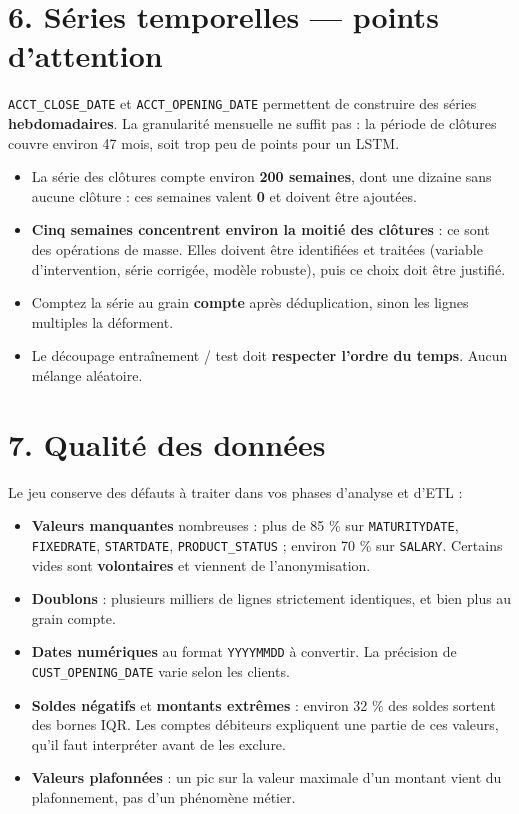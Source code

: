 \documentclass[11pt,a4paper]{article}
\providecommand{\tightlist}{\setlength{\itemsep}{0pt}\setlength{\parskip}{0pt}}
\begin{document}
\section{6. Séries temporelles --- points
d'attention}\label{suxe9ries-temporelles-points-dattention}

\texttt{ACCT\_CLOSE\_DATE} et \texttt{ACCT\_OPENING\_DATE} permettent de
construire des séries \textbf{hebdomadaires}. La granularité mensuelle
ne suffit pas : la période de clôtures couvre environ 47 mois, soit trop
peu de points pour un LSTM.

\begin{itemize}
\tightlist
\item
  La série des clôtures compte environ \textbf{200 semaines}, dont une
  dizaine sans aucune clôture : ces semaines valent \textbf{0} et
  doivent être ajoutées.
\item
  \textbf{Cinq semaines concentrent environ la moitié des clôtures} : ce
  sont des opérations de masse. Elles doivent être identifiées et
  traitées (variable d'intervention, série corrigée, modèle robuste),
  puis ce choix doit être justifié.
\item
  Comptez la série au grain \textbf{compte} après déduplication, sinon
  les lignes multiples la déforment.
\item
  Le découpage entraînement / test doit \textbf{respecter l'ordre du
  temps}. Aucun mélange aléatoire.
\end{itemize}

\section{7. Qualité des données}\label{qualituxe9-des-donnuxe9es}

Le jeu conserve des défauts à traiter dans vos phases d'analyse et d'ETL
:

\begin{itemize}
\tightlist
\item
  \textbf{Valeurs manquantes} nombreuses : plus de 85 \% sur
  \texttt{MATURITYDATE}, \texttt{FIXEDRATE}, \texttt{STARTDATE},
  \texttt{PRODUCT\_STATUS} ; environ 70 \% sur \texttt{SALARY}. Certains
  vides sont \textbf{volontaires} et viennent de l'anonymisation.
\item
  \textbf{Doublons} : plusieurs milliers de lignes strictement
  identiques, et bien plus au grain compte.
\item
  \textbf{Dates numériques} au format \texttt{YYYYMMDD} à convertir. La
  précision de \texttt{CUST\_OPENING\_DATE} varie selon les clients.
\item
  \textbf{Soldes négatifs} et \textbf{montants extrêmes} : environ 32 \%
  des soldes sortent des bornes IQR. Les comptes débiteurs expliquent
  une partie de ces valeurs, qu'il faut interpréter avant de les
  exclure.
\item
  \textbf{Valeurs plafonnées} : un pic sur la valeur maximale d'un
  montant vient du plafonnement, pas d'un phénomène métier.
\end{itemize}
\end{document}

